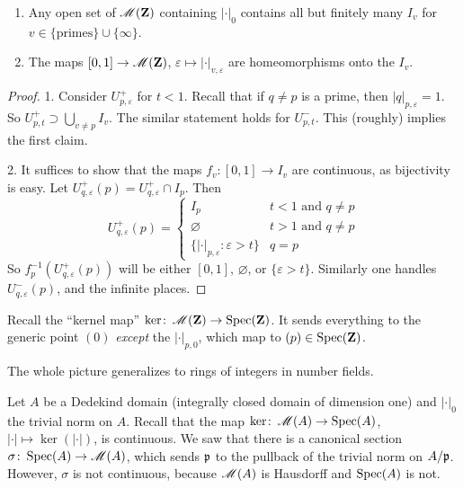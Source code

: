 \begin{proposition}
\leavevmode
\begin{enumerate}
\item
Any open set of $\operatorname{\mathscr{M}}(\mathbf{Z})$ containing $|\cdot|_0$ contains all but 
finitely many $I_v$ for $v\in \{\text{primes}\}\cup\{\infty\}$. 

\item
The maps $[0,1]\to \operatorname{\mathscr{M}}(\mathbf{Z})$, $\varepsilon\mapsto |\cdot|_{v,\varepsilon}$ 
are homeomorphisms onto the $I_v$. 
\end{enumerate}
\end{proposition}
\begin{proof}
1. Consider $U_{p,\varepsilon}^+$ for $t<1$. Recall that if $q\ne p$ is a prime, 
then $|q|_{p,\varepsilon}=1$. So $U_{p,t}^+\supset \bigcup_{v\ne p} I_v$. The 
similar statement holds for $U_{p,t}^-$. This (roughly) implies the first 
claim. 

2. It suffices to show that the maps $f_v\colon [0,1]\to I_v$ are continuous, as 
bijectivity is easy. Let $U_{q,\varepsilon}^+(p)=U_{q,\varepsilon}^+\cap I_p$. 
Then 
\[
  U_{q,\varepsilon}^+(p) = \begin{cases} I_p & t<1\text{ and }q\ne p \\ \varnothing & t>1\text{ and }q\ne p \\ \{|\cdot|_{p,\varepsilon}\colon \varepsilon>t\} & q=p \end{cases}
\]
So $f_p^{-1}(U_{q,\varepsilon}^+(p))$ will be either $[0,1]$, $\varnothing$, or 
$\{\varepsilon>t\}$. Similarly one handles $U_{q,\varepsilon}^-(p)$, and the 
infinite places. 
\end{proof}

Recall the ``kernel map'' $\ker\colon \operatorname{\mathscr{M}}(\mathbf{Z})\to \operatorname{Spec}(\mathbf{Z})$. It sends 
everything to the generic point $(0)$ \emph{except} the $|\cdot|_{p,0}$, which 
map to $(p)\in \operatorname{Spec}(\mathbf{Z})$. 

The whole picture generalizes to rings of integers in number fields. 

Let $A$ be a Dedekind domain (integrally closed domain of dimension one) and 
$|\cdot|_0$ the trivial norm on $A$. Recall that the map 
$\ker\colon \operatorname{\mathscr{M}}(A)\to \operatorname{Spec}(A)$, $|\cdot|\mapsto \ker(|\cdot|)$, is 
continuous. We saw that there is a canonical section 
$\sigma\colon \operatorname{Spec}(A)\to \operatorname{\mathscr{M}}(A)$, which sends $\mathfrak{p}$ to the pullback of 
the trivial norm on $A/\mathfrak{p}$. However, $\sigma$ is not continuous, because 
$\operatorname{\mathscr{M}}(A)$ is Hausdorff and $\operatorname{Spec}(A)$ is not. 
















